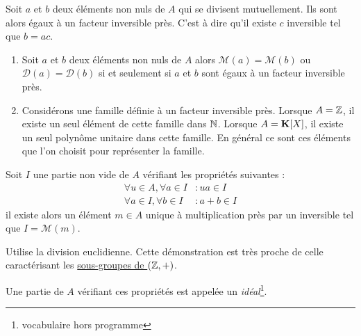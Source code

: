 \begin{prop}
 Soit $a$ et $b$ deux éléments non nuls de $A$ qui se divisent mutuellement. Ils sont alors égaux à un  facteur inversible près. C'est à dire qu'il existe $c$ inversible tel que $b=ac$.
\end{prop}
\begin{rem}
  \begin{enumerate}
       \item  Soit $a$ et $b$ deux éléments non nuls de $A$ alors $\mathcal M (a)=\mathcal M (b)$ ou  $\mathcal D (a)=\mathcal D (b)$ si et seulement si $a$ et $b$ sont égaux à un facteur inversible près.
       \item Considérons une famille définie à un facteur inversible près. Lorsque $A=\mathbb{Z}$, il existe un seul élément de cette famille dans $\mathbb{N}$. Lorsque $A=\mathbf{K}[X]$, il existe un seul polynôme unitaire dans cette famille. En général ce sont ces éléments que l'on choisit pour représenter la famille.
   \end{enumerate}

\end{rem}

\begin{prop}
 Soit $I$ une partie non vide de $A$ vérifiant les propriétés suivantes :
\begin{align*}
 \forall u\in A , \forall a\in I &: ua \in I \\
\forall a\in I , \forall b\in I &: a+b \in I 
\end{align*}
il existe alors un élément $m\in A$ unique à multiplication près par un inversible tel que $I = \mathcal M (m)$.
\end{prop}
\begin{demo}
 Utilise la division euclidienne. Cette démonstration est très proche de celle caractérisant les \href{\baseurl C2075.pdf}{sous-groupes de $(\mathbb{Z},+)$}.
\end{demo}
\begin{rem}
 Une partie de $A$ vérifiant ces propriétés est appelée un \emph{idéal}\footnote{vocabulaire hors programme}.
\end{rem}


